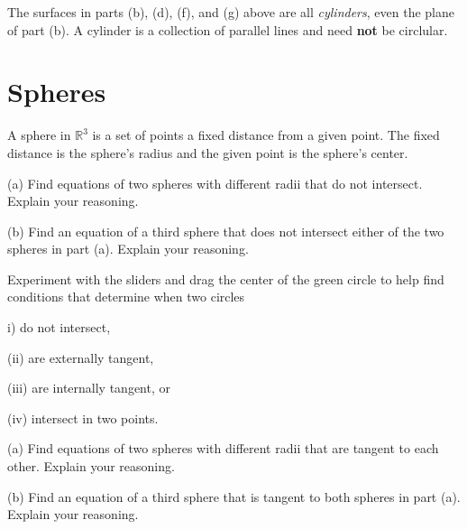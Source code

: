 \documentclass{ximera}
\begin{document}
The surfaces in parts (b), (d), (f), and (g) above are all \emph{cylinders}, even the plane of part (b). A cylinder is a collection of parallel lines and need {\bf not} be circlular.


\section{Spheres}
A sphere in $\mathbb{R}^3$ is a set of points a fixed distance from a given point. The fixed distance is the sphere's radius and the given point is the sphere's center.




\begin{question} \label{Q522:Coordinates}
(a) Find equations of two spheres with different radii that do not intersect. Explain your reasoning.

(b) Find an equation of a third sphere that does not intersect either of the two spheres in part (a). Explain your reasoning.


\begin{hint}
Experiment with the sliders and drag the center of the green circle to help find conditions that determine when two circles 

i) do not intersect,

(ii) are externally tangent,

(iii) are internally tangent, or

(iv) intersect in two points.

 
\begin{onlineOnly}
    \begin{center}
\end{center}
\end{onlineOnly}
\end{hint}




\end{question}





\begin{question} \label{Q52:Coordinates}
(a) Find equations of two spheres with different radii that are tangent to each other. Explain your reasoning.

(b) Find an equation of a third sphere that is tangent to both spheres in part (a). Explain your reasoning.
\end{question}
\end{document}
